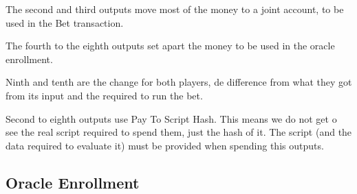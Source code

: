 The second and third outputs move most of the money to a joint account, to
  be used in the Bet transaction.

The fourth to the eighth outputs set apart the money to be used in the oracle
  enrollment.

Ninth and tenth are the change for both players, de difference from what they
  got from its input and the required to run the bet.

Second to eighth outputs use Pay To Script Hash.
This means we do not get o see the real script required to spend them, just the
  hash of it.
The script (and the data required to evaluate it) must be provided when spending
  this outputs.

\subsection{Oracle Enrollment}

